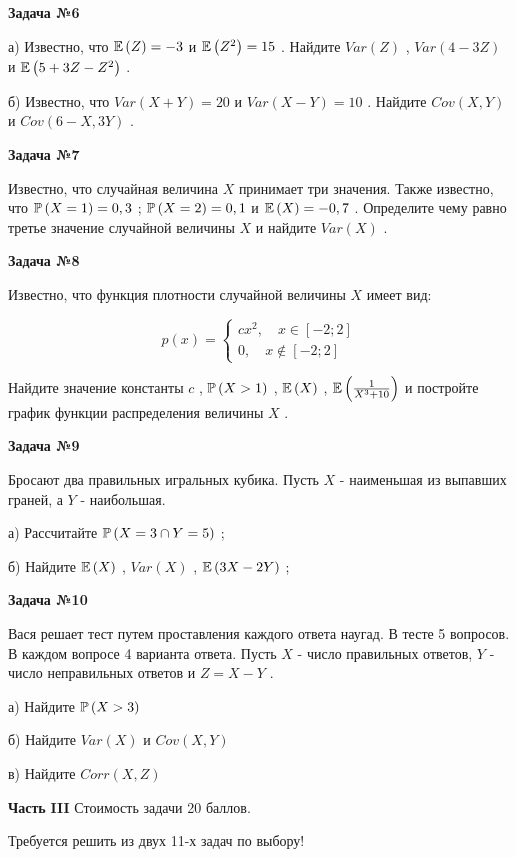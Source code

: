 \documentclass[pdftex,12pt,a4paper]{article}
\begin{document}
{\bf Задача №6}

а)	Известно, что  $\E\left(Z\right)=-3$  и  $\E\left(Z^{2} \right)=15$ . Найдите  $Var\left(Z\right)$ ,  $Var\left(4-3Z\right)$  и  $\E\left(5+3Z-Z^{2} \right)$ .

б)	Известно, что  $Var\left(X+Y\right)=20$  и  $Var\left(X-Y\right)=10$ . Найдите  $Cov\left(X,Y\right)$  и  $Cov\left(6-X,3Y\right)$ .

{\bf Задача №7}

Известно, что случайная величина  $X$  принимает три значения. Также известно, что  $\P\left(X=1\right)=0,3$ ;  $\P\left(X=2\right)=0,1$  и  $\E\left(X\right)=-0,7$ . Определите чему равно третье значение случайной величины  $X$  и найдите  $Var\left(X\right)$ .

\pagebreak 

{\bf Задача №8}

Известно, что функция плотности случайной величины  $X$  имеет вид:

$$p\left(x\right)=\left\{\begin{array}{l} {cx^{2} ,\quad x\in [-2;2]} \\ {0,\quad x\notin [-2;2]} \end{array}\right. $$

Найдите значение константы  $c$ ,  $\P\left(X>1\right)$ ,  $\E\left(X\right)$ ,  $\E\left(\frac{1}{X^{3} +10} \right)$  и постройте график функции распределения величины  $X$ .

{\bf Задача №9}

Бросают два правильных игральных кубика. Пусть  $X$  - наименьшая из выпавших граней, а  $Y$  - наибольшая.

а)	Рассчитайте  $\P\left(X=3\cap Y=5\right)$ ;

б)	Найдите  $\E\left(X\right)$ ,  $Var\left(X\right)$ ,  $\E\left(3X-2Y\right)$ ;

{\bf Задача №10}

Вася решает тест путем проставления каждого ответа наугад. В тесте 5 вопросов. В каждом вопросе 4 варианта ответа. Пусть  $X$  - число правильных ответов,  $Y$  - число неправильных ответов и  $Z=X-Y$ .

а)	Найдите  $\P\left(X>3\right)$ 

б)	Найдите  $Var\left(X\right)$  и  $Cov\left(X,Y\right)$ 

в)	Найдите  $Corr\left(X,Z\right)$ 

{\bf Часть }{\bf III} Стоимость задачи 20 баллов.

Требуется решить {\bf {}} из двух 11-х задач по выбору!
\end{document}
